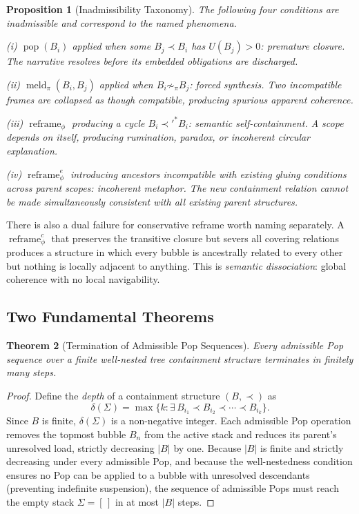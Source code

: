 \documentclass[12pt, a4paper]{article}
\theoremstyle{plain}
\newtheorem{theorem}{Theorem}[section]
\newtheorem{proposition}[theorem]{Proposition}
\theoremstyle{definition}
\theoremstyle{remark}
\DeclareMathOperator{\Pop}{pop}
\DeclareMathOperator{\Meld}{meld}
\DeclareMathOperator{\Reframe}{reframe}
\begin{document}
\begin{proposition}[Inadmissibility Taxonomy]
The following four conditions are inadmissible and correspond to the named
phenomena.

(i) $\Pop(B_i)$ applied when some $B_j \prec B_i$ has $U(B_j) > 0$:
\emph{premature closure}. The narrative resolves before its embedded
obligations are discharged.

(ii) $\Meld_\pi(B_i, B_j)$ applied when $B_i \not\sim_\pi B_j$:
\emph{forced synthesis}. Two incompatible frames are collapsed as though
compatible, producing spurious apparent coherence.

(iii) $\Reframe_\phi$ producing a cycle $B_i \prec'^* B_i$:
\emph{semantic self-containment}. A scope depends on itself, producing
rumination, paradox, or incoherent circular explanation.

(iv) $\Reframe^e_\phi$ introducing ancestors incompatible with existing
gluing conditions across parent scopes: \emph{incoherent metaphor}. The
new containment relation cannot be made simultaneously consistent with all
existing parent structures.
\end{proposition}

There is also a dual failure for conservative reframe worth naming
separately. A $\Reframe^c_\phi$ that preserves the transitive closure but
severs all covering relations produces a structure in which every bubble is
ancestrally related to every other but nothing is locally adjacent to
anything. This is \emph{semantic dissociation}: global coherence with no
local navigability.

\subsection{Two Fundamental Theorems}

\begin{theorem}[Termination of Admissible Pop Sequences]
Every admissible Pop sequence over a finite well-nested tree containment
structure terminates in finitely many steps.
\end{theorem}

\begin{proof}
Define the \emph{depth} of a containment structure $(B, \prec)$ as
\[
  \delta(\Sigma) = \max \{ k : \exists\, B_{i_1} \prec B_{i_2} \prec \cdots \prec B_{i_k} \}.
\]
Since $B$ is finite, $\delta(\Sigma)$ is a non-negative integer. Each admissible
Pop operation removes the topmost bubble $B_n$ from the active stack and reduces
its parent's unresolved load, strictly decreasing $|B|$ by one. Because $|B|$
is finite and strictly decreasing under every admissible Pop, and because the
well-nestedness condition ensures no Pop can be applied to a bubble with
unresolved descendants (preventing indefinite suspension), the sequence of
admissible Pops must reach the empty stack $\Sigma = [\,]$ in at most $|B|$
steps.
\end{proof}
\end{document}

